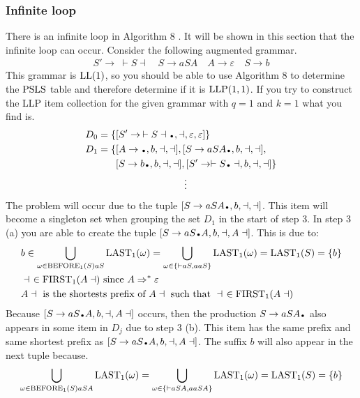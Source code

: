 \subsubsection{Infinite loop}\label{sec:infinite_loop}
There is an infinite loop in Algorithm 8 \cite[13]{Vagner2007}. It will be shown in this section that the infinite loop can occur. Consider the following augmented grammar.
\begin{align*}
    S' \to \: \vdash S \dashv \quad S \to aSA \quad A \to \varepsilon \quad S \to b
\end{align*}
This grammar is $\text{LL}(1)$, so you should be able to use Algorithm 8 to determine the $\text{PSLS}$ table and therefore determine if it is $\text{LLP}(1, 1)$. If you try to construct the LLP item collection for the given grammar with $q = 1$ and $k = 1$ what you find is.
\begin{align*}
    D_0 = \{& [S' \to \: \vdash S \dashv\bigdot, \dashv, \varepsilon, \varepsilon]\} \\
    D_1 = \{& [A \to \bigdot , b, \dashv, \dashv], [S \to a S A\bigdot , b, \dashv, \dashv], \\
    & [S \to b\bigdot , b, \dashv, \dashv],[S' \to \vdash S\bigdot \dashv, b, \dashv, \dashv]\} \\
    & \qquad\qquad\qquad\quad \vdots
\end{align*}
The problem will occur due to the tuple $[S \to a S A\bigdot , b, \dashv, \dashv]$. This item will become a singleton set when grouping the set $D_1$ in the start of step 3. In step 3 (a) you are able to create the tuple $[S \to a S\bigdot A, b, \dashv, A \dashv]$. This is due to:
\begin{align*}
    & b \in \bigcup_{\omega \in \text{BEFORE}_1(S) aS} \text{LAST}_1(\omega) = \bigcup_{\omega \in \{\vdash aS, aaS\}} \text{LAST}_1(\omega) = \text{LAST}_1(S) = \{b\} \\
    & \dashv \:\, \in \text{FIRST}_1(A\dashv) \text{ since } A \Rightarrow^* \varepsilon \\
    & A\dashv \text{ is the shortests prefix of } A\dashv \text{ such that } \dashv \:\,\in \text{FIRST}_1(A\dashv)
\end{align*}
Because $[S \to a S\bigdot A, b, \dashv, A \dashv]$ occurs, then the production $S \to a S A\bigdot$ also appears in some item in $D_j$ due to step 3 (b). This item has the same prefix and same shortest prefix as $[S \to a S\bigdot A, b, \dashv, A \dashv]$. The suffix $b$ will also appear in the next tuple because. 
\begin{align*}
    \bigcup_{\omega \in \text{BEFORE}_1(S) aSA} \text{LAST}_1(\omega) = \bigcup_{\omega \in \{\vdash aSA, aaSA\}} \text{LAST}_1(\omega) = \text{LAST}_1(S) = \{b\}
\end{align*}
